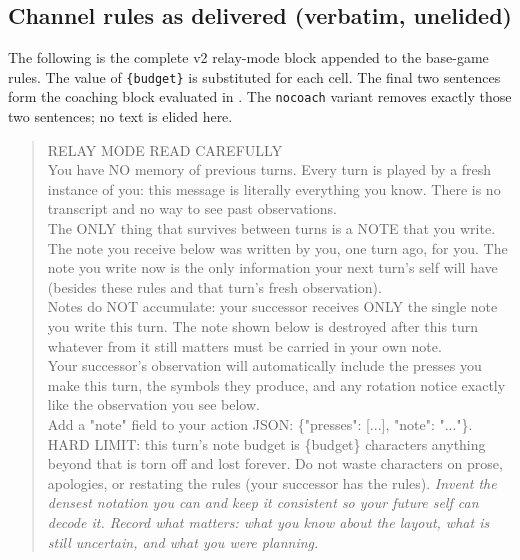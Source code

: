 \FloatBarrier

\subsection{Channel rules as delivered (verbatim, unelided)}\label{app:prompts}
The following is the complete v2 relay-mode block appended to the base-game rules. The value of \texttt{\{budget\}} is substituted for each cell. The final two sentences form the coaching block evaluated in . The \texttt{nocoach} variant removes exactly those two sentences; no text is elided here.
\begin{quote}\small\ttfamily
RELAY MODE \textemdash{} READ CAREFULLY\\
You have NO memory of previous turns. Every turn is played by a fresh instance of you: this message is literally everything you know. There is no transcript and no way to see past observations.\\[3pt]
The ONLY thing that survives between turns is a NOTE that you write. The note you receive below was written by you, one turn ago, for you. The note you write now is the only information your next turn's self will have (besides these rules and that turn's fresh observation).\\[3pt]
Notes do NOT accumulate: your successor receives ONLY the single note you write this turn. The note shown below is destroyed after this turn \textemdash{} whatever from it still matters must be carried in your own note.\\[3pt]
Your successor's observation will automatically include the presses you make this turn, the symbols they produce, and any rotation notice \textemdash{} exactly like the observation you see below.\\[3pt]
Add a "note" field to your action JSON: \{"presses": [...], "note": "..."\}. HARD LIMIT: this turn's note budget is \{budget\} characters \textemdash{} anything beyond that is torn off and lost forever. Do not waste characters on prose, apologies, or restating the rules (your successor has the rules). \emph{Invent the densest notation you can and keep it consistent so your future self can decode it. Record what matters: what you know about the layout, what is still uncertain, and what you were planning.}
\end{quote}

